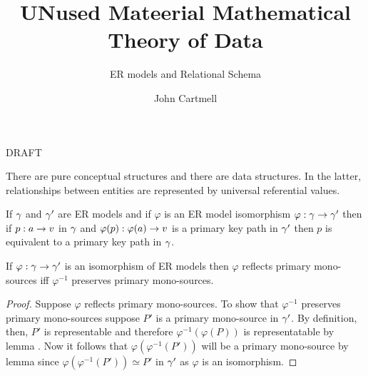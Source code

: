 \documentclass[10pt,a4paper]{scrartcl}
\begin{document}
\title{UNused Mateerial Mathematical Theory of Data}
\subtitle{ER models and Relational Schema}
\author{John Cartmell}
\maketitle
\begin{center}
DRAFT
\end{center}
There are pure conceptual structures and there are data structures. In the latter, relationships between entities are represented by universal
referential values.

\begin{lemma}
If $\gamma$ and $\gamma'$ are ER models and if $\varphi$ is an ER model isomorphism $\varphi: \gamma \rightarrow \gamma'$ then if $p:a \rightarrow v$ in $\gamma$ and $\varphi(p) :\varphi(a) \rightarrow v$ is a primary key path in $\gamma'$ then $p$ is equivalent to a primary key path in $\gamma$.
\end{lemma}

\begin{lemma}
If $\varphi: \gamma \rightarrow \gamma'$ is an isomorphism of ER models  then
$\varphi$ reflects primary mono-sources iff $\varphi^{-1}$ preserves primary mono-sources.
\end{lemma}
\begin{proof}
Suppose $\varphi$ reflects primary mono-sources. To show that $\varphi^{-1}$ preserves primary mono-sources suppose
 $P'$ is a primary mono-source in $\gamma'$. By definition, then,  $P'$ is representable  and therefore $\varphi^{-1}(\varphi(P))$ is representatable 
by lemma .  Now it follows that  $\varphi(\varphi^{-1}(P'))$ will be a primary mono-source by lemma  since $\varphi(\varphi^{-1}(P')) \simeq P'$ in $\gamma'$ as $\varphi$ is an isomorphism. 
\end{proof}
\end{document}
